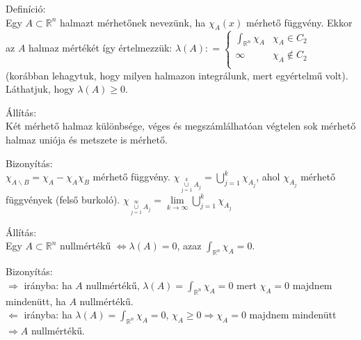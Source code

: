 \documentclass[12pt,a4paper]{scrartcl}
\newenvironment{definicio}{}{}
\newenvironment{bizonyitas}{}{}
\newenvironment{allitas}{}{}
\begin{document}
\begin{definicio}

Definíció:\\
Egy \(A \subset {\mathbb{R}}^{n}\) halmazt mérhetőnek nevezünk, ha
\(\chi_{A}\left( x \right)\) mérhető függvény. Ekkor az \(A\) halmaz
mértékét így értelmezzük:
\(\lambda\left( A \right): = \left\{ \begin{matrix} {\int_{{\mathbb{R}}^{n}}\chi_{A}} & {\chi_{A} \in C_{2}} \\ \infty & {\chi_{A} \notin C_{2}} \\ \end{matrix} \right.\)
(korábban lehagytuk, hogy milyen halmazon integrálunk, mert egyértelmű
volt). Láthatjuk, hogy \(\lambda\left( A \right) \geq 0\).

\end{definicio}

\begin{allitas}

Állítás:\\
Két mérhető halmaz különbsége, véges és megszámlálhatóan végtelen sok
mérhető halmaz uniója és metszete is mérhető.

\end{allitas}

\begin{bizonyitas}

Bizonyítás:\\
\(\chi_{A\backslash B} = \chi_{A} - \chi_{A}\chi_{B}\) mérhető függvény.
\(\chi_{\underset{j = 1}{\overset{k}{\cup}}A_{j}} = {\bigcup\limits_{j = 1}^{k}\chi_{A_{j}}}\),
ahol \(\chi_{A_{j}}\) mérhető függvények (felső burkoló).
\(\chi_{\underset{j = 1}{\overset{\infty}{\cup}}A_{j}} = \lim\limits_{k\rightarrow\infty}{\bigcup\limits_{j = 1}^{k}\chi_{A_{j}}}\)

\end{bizonyitas}

\begin{allitas}

Állítás:\\
Egy \(A \subset {\mathbb{R}}^{n}\) nullmértékű
\(\left. \Leftrightarrow\lambda\left( A \right) = 0 \right.\), azaz
\({\int_{{\mathbb{R}}^{n}}\chi_{A}} = 0\).

\end{allitas}

\begin{bizonyitas}

Bizonyítás:\\
\(\Rightarrow\) irányba: ha \(A\) nullmértékű,
\(\lambda\left( A \right) = {\int_{{\mathbb{R}}^{n}}\chi_{A}} = 0\) mert
\(\chi_{A} = 0\) majdnem mindenütt, ha \(A\) nullmértékű.\\
\(\Leftarrow\) irányba: ha
\(\lambda\left( A \right) = {\int_{{\mathbb{R}}^{n}}\chi_{A}} = 0\),
\(\left. \chi_{A} \geq 0\Rightarrow\chi_{A} = 0 \right.\) majdnem
mindenütt \(\left. \Rightarrow A \right.\) nullmértékű.

\end{bizonyitas}
\end{document}
